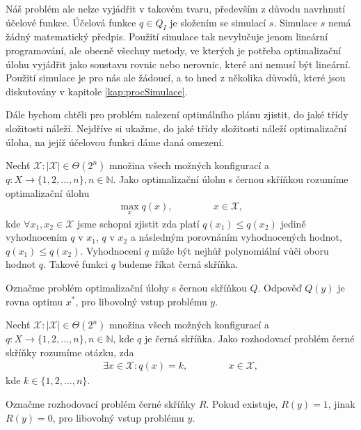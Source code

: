 Náš problém ale nelze vyjádřit v takovém tvaru, především z důvodu navrhnutí účelové funkce.
Účelová funkce $q \in Q_I$ je složením se simulací $s$. Simulace $s$ nemá žádný matematický předpis.
Použití simulace tak nevylučuje jenom lineární programování, ale obecně všechny metody, ve kterých je potřeba optimalizační úlohu vyjádřit jako
soustavu rovnic nebo nerovnic, které ani nemusí být lineární.
Použití simulace je pro nás ale žádoucí, a to hned z několika důvodů, které jsou diskutovány v kapitole \ref{kap:procSimulace}.

Dále bychom chtěli pro problém nalezení optimálního plánu zjistit, do jaké třídy složitosti náleží. 
Nejdříve si ukažme, do jaké třídy složitosti náleží optimalizační úloha, na jejíž účelovou funkci dáme daná omezení.

\begin{definice}\label{df:Q}
  Nechť $\mathcal{X} \colon |\mathcal{X}| \in \Theta(2^n)$ množina všech možných konfigurací a $q \colon X \rightarrow \{ 1, 2, \dots, n \}, n \in \mathbb{N}$.
  Jako optimalizační úlohu s černou skříňkou rozumíme optimalizační úlohu
  \begin{align*}
    \max_{x} q(x), \hspace{50pt} x \in \mathcal{X},
  \end{align*}
  kde $\forall x_1, x_2 \in \mathcal{X}$ jsme schopni zjistit zda platí $q(x_1) \leq q(x_2)$ jedině vyhodnocením $q$ v $x_1$,
  $q$ v $x_2$ a následným porovnáním vyhodnocených hodnot, $q(x_1) \leq q(x_2)$.
  Vyhodnocení $q$ může být nejhůř polynomiální vůči oboru hodnot $q$.
  Takové funkci $q$ budeme říkat černá skříňka.

  Označme problém optimalizační úlohy s černou skříňkou $Q$.
  Odpověď $Q(y)$ je rovna optimu $x^*$, pro libovolný vstup problému $y$.
\end{definice}

\begin{definice}\label{df:R}
  Nechť $\mathcal{X} \colon |\mathcal{X}| \in \Theta(2^n)$ množina všech možných konfigurací a $q \colon X \rightarrow \{ 1, 2, \dots, n \}, n \in \mathbb{N}$,
  kde $q$ je černá skříňka.
  Jako rozhodovací problém černé skříňky rozumíme otázku, zda
  \begin{align*}
    \exists x \in \mathcal{X} \colon q(x) = k, \hspace{50pt} x \in \mathcal{X},
  \end{align*}
  kde $k \in \{ 1, 2, \dots, n \}$.

  Označme rozhodovací problém černé skříňky $R$.
  Pokud existuje, $R(y) = 1$, jinak $R(y) = 0$, pro libovolný vstup problému $y$. 
\end{definice}

